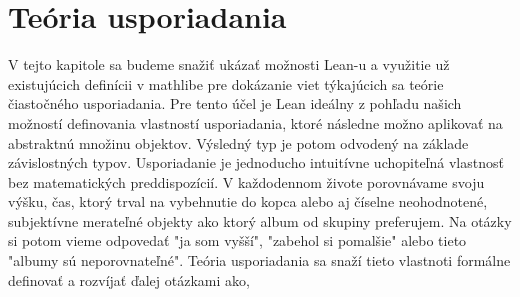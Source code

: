 \documentclass[a4paper,10pt,oneside]{report}%
\begin{document}
\chapter{Teória usporiadania}
    V tejto kapitole sa budeme snažiť ukázať možnosti Lean-u a využitie už existujúcich
definícii v mathlibe pre dokázanie viet týkajúcich sa teórie čiastočného usporiadania.
    Pre tento účel je Lean ideálny z pohľadu našich možností definovania vlastností
usporiadania, ktoré následne možno aplikovať na abstraktnú množinu objektov.
    Výsledný typ je potom odvodený na základe závislostných typov.
    Usporiadanie je jednoducho intuitívne uchopiteľná vlastnosť bez matematických
preddispozícií.
    V každodennom živote porovnávame svoju výšku, čas, ktorý trval na vybehnutie do kopca
alebo aj číselne neohodnotené, subjektívne merateľné objekty ako ktorý album
od skupiny preferujem.
    Na otázky si potom vieme odpovedať "ja som vyšší", "zabehol si pomalšie" alebo
tieto "albumy sú neporovnateľné".
    Teória usporiadania sa snaží tieto vlastnoti formálne definovať a rozvíjať ďalej
otázkami ako,
\end{document}

